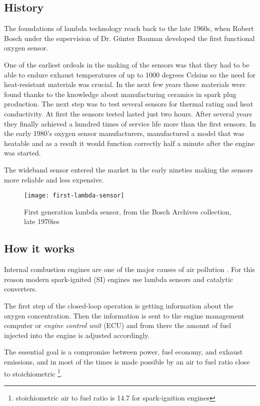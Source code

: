 \subsection{History}
The foundations of lambda technology reach back to the late 1960s, when Robert Bosch under the supervision of Dr. Günter Bauman developed the first functional oxygen sensor.

One of the earliest ordeals in the making of  the sensors was that they had to be able to endure exhaust temperatures of up to 1000 degrees Celsius so the need for heat-resistant materials was crucial. In the next few years these materials were found thanks to the knowledge about manufacturing ceramics in spark plug production. The next step was to test several sensors for thermal rating and heat conductivity. At first the sensors tested lasted just two hours. After several years they finally achieved a hundred times of service life more than the first sensors. In the early 1980’s oxygen sensor manufacturers, manufactured a model that was heatable and as a result  it would function correctly half a minute after the engine was started.

The wideband sensor entered the market in the early nineties making the sensors more reliable and less expensive.
 

\begin{figure}[H]
    \centering
    \texttt{[image: first-lambda-sensor]}
    \caption{First generation lambda sensor, from the Bosch Archives collection, late 1970ies \cite{bosch}} 
    \label{fig:first_sensor}
\end{figure}



\subsection{How it works}
Internal combustion engines are one of the major causes of air pollution\cite{Nielsen_2000} \cite{worldbank} \cite{TWIGG20072}. For this reason modern spark-ignited (SI) engines use lambda sensors and catalytic converters. 

The first step of the closed-loop operation is getting information about the oxygen concentration. Then the information is sent to the engine management computer or \textit{engine control unit} (ECU) and from there the amount of fuel injected into the engine is adjusted accordingly. 
 
The essential goal is a compromise between power, fuel economy, and exhaust  emissions, and in most of the times is made possible by an air to fuel ratio close to stoichiometric \footnote{stoichiometric air to fuel ratio is 14.7 for spark-ignition engines}. 
 
